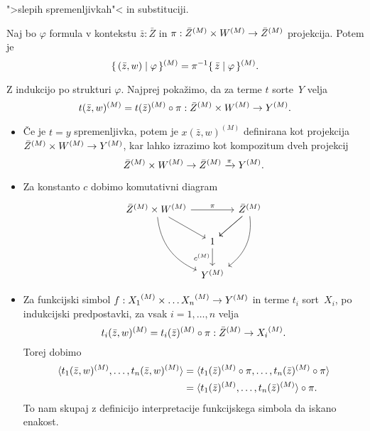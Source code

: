 \documentclass[../kategoricna_logika.tex]{subfiles}
\begin{document}
">slepih spremenljivkah"< in substituciji.
\begin{lema}\label{lema:slepe-spremenljivke}
  Naj bo $\varphi$ formula v kontekstu $\bar{z}:\bar{Z}$ in
  $\pi : \bar{Z}^{(M)} \times W^{(M)} \to {\bar{Z}}^{(M)}$
  projekcija. Potem je
  $$\lbrace\,(\bar{z}, w)  \mid  \varphi\,\rbrace^{(M)} = \pi^{-1} \lbrace\,\bar{z}  \mid  \varphi\,\rbrace^{(M)}.$$
\end{lema}
\begin{dokaz}
  Z indukcijo po strukturi $\varphi$.  Najprej pokažimo, da za terme
  $t$ sorte~$Y$ velja
  $$t(\bar{z}, w)^{(M)} = t(\bar{z})^{(M)} \circ \pi : {\bar{Z}}^{(M)} \times W^{(M)} \to {Y}^{(M)}.$$
  \begin{itemize}
  \item Če je $t = y$ spremenljivka, potem je $x(\bar{z},w)^{(M)}$
    definirana kot projekcija
    ${\bar{Z}}^{(M)} \times {W}^{(M)} \to Y^{(M)}$, kar lahko
    izrazimo kot kompozitum dveh projekcij
      $${\bar{Z}}^{(M)} \times {W}^{(M)} \to \bar{Z}^{(M)} \xrightarrow{\pi} Y^{(M)}.$$

    \item Za konstanto $c$ dobimo komutativni diagram
      \begin{equation*}
        \begin{tikzcd}[column sep=tiny]
          \bar{Z}^{(M)} \times \interp{W} \ar[ddr, bend right] \ar[dr]
          \ar[rr, "\pi"] & &
          \bar{Z}^{(M)} \ar[dl] \ar[dl] \ar[ddl, bend left] \\
          & 1 \ar[d, "c^{(M)}"'] & \\
          & Y^{(M)} &
        \end{tikzcd}
      \end{equation*}
    
    \item Za funkcijski simbol
      $f : {X_1}^{(M)} \times \ldots {X_n}^{(M)} \to {Y}^{(M)}$ in
      terme $t_i$ sort~$X_i$, po indukcijski predpostavki, za vsak
      $i = 1, \ldots, n$ velja
      \[t_i(\bar{z},w)^{(M)} = t_i(\bar{z})^{(M)} \circ \pi :
        {\bar{Z}}^{(M)} \to {X_i}^{(M)}.\] Torej dobimo
      \begin{align*}
        \langle t_1(\bar{z}, w)^{(M)}, \ldots, t_n(\bar{z}, w)^{(M)} \rangle &= \langle t_1(\bar{z})^{(M)} \circ \pi, \ldots, t_n(\bar{z})^{(M)} \circ \pi \rangle \\
                                                                     &= \langle t_1(\bar{z})^{(M)}, \ldots, t_n(\bar{z})^{(M)} \rangle \circ \pi.
      \end{align*}
      To nam skupaj z definicijo interpretacije funkcijskega simbola
      da iskano enakost.


\end{itemize}
\end{dokaz}
\end{document}
